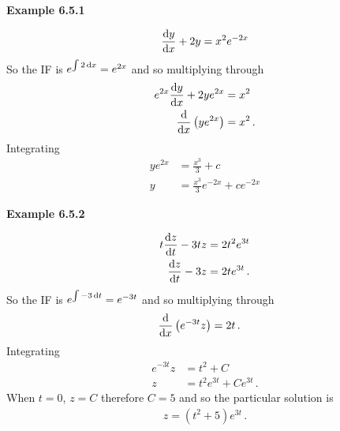 \vspace{10mm}
\textbf{Example 6.5.1}

\begin{align*}
	\frac{{\rm d} y}{{\rm d} x} + 2y = x^2 e^{-2x} 
\end{align*}
So the IF is $e^{\int 2 \, {\rm d} x} = e^{2x}$ and so multiplying through
\begin{align*}
	e^{2x}\frac{{\rm d} y}{{\rm d} x} + 2ye^{2x} &= x^2 \\ 
	\frac{{\rm d} }{{\rm d} x} \left(y e^{2x} \right) &= x^2 \, .
\end{align*}
Integrating
\begin{align*}
	y e^{2x} &= \frac{x^3}{3} + c \\
	y &= \frac{x^3}{3}e^{-2x} + ce^{-2x}
\end{align*}

\vspace{10mm}
\textbf{Example 6.5.2}

\begin{align*}
	t \frac{{\rm d} z}{{\rm d} t} - 3tz &= 2 t^2 e^{3t} \\
	\frac{{\rm d} z}{{\rm d} t} - 3 z &= 2 t e^{3t} \,. 
\end{align*}
So the IF is $e^{\int -3 \, {\rm d} t} = e^{-3t}$ and so multiplying through
\begin{align*}
	\frac{{\rm d} }{{\rm d} x} \left(e^{-3t} z \right) &= 2 t \, .
\end{align*}
Integrating
\begin{align*}
	e^{-3t} z  &= t^2 + C \\
	z &= t^2 e^{3t} + C e^{3t} \, .
\end{align*}
When $t=0$, $z = C$ therefore $C=5$ and so the particular solution is
\begin{align*}
	z = (t^2 + 5) e^{3t}\, .
\end{align*}
